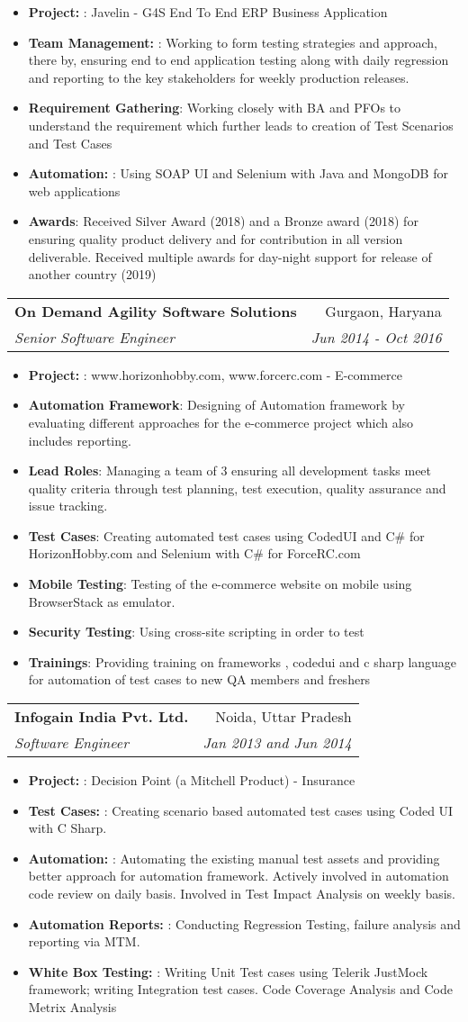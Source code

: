 \documentclass[letterpaper,11pt]{article}
\makeatletter
\newcommand{\resumeItem}[2]{
  \item\small{
    \textbf{#1}{: #2 \vspace{-2pt}}
  }
}
\newcommand{\resumeSubheading}[4]{
  \vspace{-1pt}\item
    \begin{tabular*}{0.97\textwidth}{l@{\extracolsep{\fill}}r}
      \textbf{#1} & #2 \\
      \textit{\small#3} & \textit{\small #4} \\
    \end{tabular*}\vspace{-5pt}
}
\newcommand{\resumeItemListStart}{\begin{itemize}}
\newcommand{\resumeItemListEnd}{\end{itemize}\vspace{-5pt}}
\makeatother
\begin{document}
      \resumeItemListStart
      \resumeItem{Project: }
          {Javelin - G4S End To End ERP Business Application}
          \resumeItem{Team Management: }
          {Working to form testing strategies and approach, there by, ensuring end to end application testing along with daily regression and reporting to the key stakeholders for weekly production releases.}
        \resumeItem{Requirement Gathering}
          {Working closely with BA and PFOs to understand the requirement which further leads to creation of Test Scenarios and Test Cases}
        \resumeItem{Automation: }
          {Using SOAP UI and Selenium with Java and MongoDB for web applications}
         \resumeItem{Awards}
          {Received Silver Award (2018) and a Bronze award (2018) for ensuring quality product delivery and for contribution in all version deliverable. Received multiple awards for day-night support for release of another country (2019)}
      \resumeItemListEnd

    \resumeSubheading
      {On Demand Agility Software Solutions}{Gurgaon, Haryana}
      {Senior Software Engineer}{Jun 2014 - Oct 2016}
      \resumeItemListStart
       \resumeItem{Project: }
          {www.horizonhobby.com, www.forcerc.com - E-commerce}
        \resumeItem{Automation Framework}
          {Designing of Automation framework by evaluating different approaches for the e-commerce project which also includes reporting.}
          \resumeItem{Lead Roles}
          {Managing a team of 3 ensuring all development tasks meet quality criteria through test planning, test execution, quality assurance and issue tracking.}
        \resumeItem{Test Cases}
          {Creating automated test cases using CodedUI and C\# for HorizonHobby.com and Selenium with C\# for ForceRC.com}       
        \resumeItem{Mobile Testing}
          {Testing of the e-commerce website on mobile using BrowserStack as emulator.}
        \resumeItem{Security Testing}
          {Using cross-site scripting in order to test }
        \resumeItem{Trainings}
          {Providing training on frameworks , codedui and c sharp language for automation of test cases to new QA members and freshers}
      \resumeItemListEnd
    \resumeSubheading
      {Infogain India Pvt. Ltd.}{Noida, Uttar Pradesh}
      {Software Engineer}{Jan 2013 and Jun 2014}   
      \resumeItemListStart
        \resumeItem{Project: }
          {Decision Point (a Mitchell Product) - Insurance }
        \resumeItem{Test Cases: }
          {Creating scenario based automated test cases using Coded UI with C Sharp.}
        \resumeItem{Automation: }
          {Automating the existing manual test assets and providing better approach for automation framework. Actively involved in automation code review on daily basis. Involved in Test Impact Analysis on weekly basis.}
        \resumeItem{Automation Reports: }
          {Conducting Regression Testing, failure analysis and reporting via MTM.}
           \resumeItem{White Box Testing: }
          {Writing Unit Test cases using Telerik JustMock framework; writing Integration test cases. Code Coverage Analysis and Code Metrix Analysis}
      \resumeItemListEnd
\end{document}
